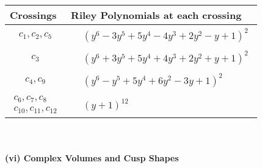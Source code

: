 \documentclass[1p]{elsarticle_modified}
\theoremstyle{definition}
\begin{document}
\begin{tabular}{m{50pt}|m{274pt}}
Crossings & \hspace{64pt}Riley Polynomials at each crossing \\
\hline $$\begin{aligned}c_{1},c_{2},c_{5}\end{aligned}$$&$\begin{aligned}
&(y^6-3 y^5+5 y^4-4 y^3+2 y^2- y+1)^2
\end{aligned}$\\
\hline $$\begin{aligned}c_{3}\end{aligned}$$&$\begin{aligned}
&(y^6+3 y^5+5 y^4+4 y^3+2 y^2+y+1)^2
\end{aligned}$\\
\hline $$\begin{aligned}c_{4},c_{9}\end{aligned}$$&$\begin{aligned}
&(y^6- y^5+5 y^4+6 y^2-3 y+1)^2
\end{aligned}$\\
\hline $$\begin{aligned}c_{6},c_{7},c_{8}\\c_{10},c_{11},c_{12}\end{aligned}$$&$\begin{aligned}
&(y+1)^{12}
\end{aligned}$\\
\hline
\end{tabular}\\~\\
\newpage\flushleft \textbf{(vi) Complex Volumes and Cusp Shapes}
\end{document}

